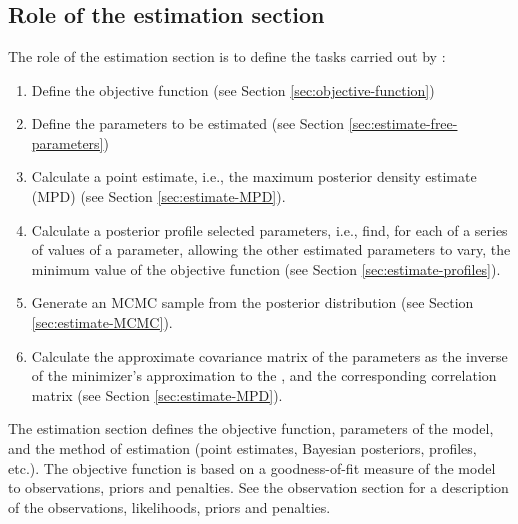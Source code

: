 \section{\label{sec:estimation-section}}

\subsection{Role of the estimation section\label{sec:role-of-the-estimation-section}}
The role of the estimation section is to define the tasks carried out by \CNAME: 

\begin{enumerate}
  \item Define the objective function (see Section \ref{sec:objective-function})
  \item Define the parameters to be estimated (see Section \ref{sec:estimate-free-parameters})
  \item Calculate a point estimate, i.e., the maximum posterior density estimate (MPD) (see Section \ref{sec:estimate-MPD}).
  \item Calculate a posterior profile selected parameters, i.e., find, for each of a series of values of a parameter, allowing the other estimated parameters to vary, the minimum value of the objective function (see Section \ref{sec:estimate-profiles}).
  \item Generate an MCMC sample from the posterior distribution (see Section \ref{sec:estimate-MCMC}).
  \item Calculate the approximate covariance matrix of the parameters as the inverse of the minimizer\textquoteright{}s approximation to the , and the corresponding correlation matrix (see Section \ref{sec:estimate-MPD}).
\end{enumerate}

The estimation section defines the objective function, parameters of the model, and the method of estimation (point estimates, Bayesian posteriors, profiles, etc.). The objective function is based on a goodness-of-fit measure of the model to observations, priors and penalties. See the observation section for a description of the observations, likelihoods, priors and penalties. 

\subsection{\label{sec:objective-function}}


